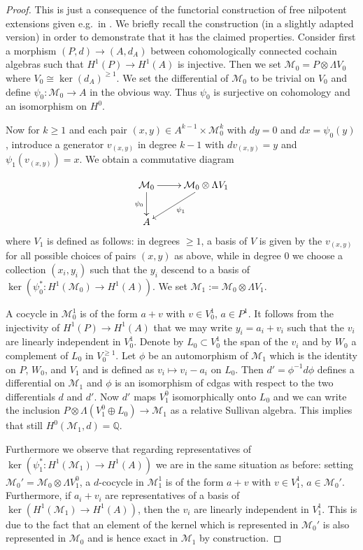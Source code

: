 \documentclass[12pt,a4paper]{article}
\theoremstyle{definition}
\begin{document}
\begin{proof}
This is just a consequence of the functorial construction of free nilpotent extensions given e.g.\ in \cite[Section 4.7]{BG}. We briefly recall the construction (in a slightly adapted version) in order to demonstrate that it has the claimed properties. Consider first a morphism $(P,d)\rightarrow (A,d_A)$ between cohomologically connected cochain algebras such that $H^1(P)\rightarrow H^1(A)$ is injective. Then we set $\mathcal{M}_0=P\otimes \Lambda V_0$ where $V_0\cong \ker (d_A)^{\geq 1}$. We set the differential of $\mathcal{M}_0$ to be trivial on $V_0$ and define $\psi_0\colon \mathcal{M}_0\rightarrow A$ in the obvious way. Thus $\psi_0$ is surjective on cohomology and an isomorphism on $H^0$.

Now for $k\geq 1$ and each pair $(x,y)\in A^{k-1}\times \mathcal{M}_0^k$ with $dy=0$ and $dx=\psi_0(y)$, introduce a generator $v_{(x,y)}$ in degree $k-1$ with $dv_{(x,y)}=y$ and $\psi_1(v_{(x,y)})=x$. We obtain a commutative diagram

\[\xymatrix{
\mathcal{M}_0\ar[r]\ar[d]_{\psi_0}& \mathcal{M}_0\otimes \Lambda V_1\ar[dl]^{\psi_1}\\ A &
}\]
where $V_1$ is defined as follows:
in degrees $\geq 1$, a basis of $V$ is given by the $v_{(x,y)}$ for all possible choices of pairs $(x,y)$ as above, while in degree $0$ we choose a collection $(x_i,y_i)$ such that the $y_i$ descend to a basis of $\ker(\psi_0^*\colon H^1(\mathcal{M}_0)\rightarrow H^1(A))$. We set $\mathcal{M}_1:=\mathcal{M}_0\otimes \Lambda V_1$.

A cocycle in $\mathcal{M}_0^1$ is of the form $a+v$ with $v\in V_0^1$, $a\in P^1$.
It follows from the injectivity of $H^1(P)\rightarrow H^1(A)$ that we may write $y_i=a_i+v_i$ such that the $v_i$ are linearly independent in $V_0^1$. Denote by $L_0\subset V_0^1$ the span of the $v_i$ and by $W_0$ a complement of $L_0$ in $V_0^{\geq 1}$. Let $\phi$ be an automorphism of $\mathcal{M}_1$ which is the identity on $P$, $W_0$, and $V_1$ and is defined as $v_i\mapsto v_i-a_i$ on $L_0$. Then $d'=\phi^{-1}d\phi$ defines a differential on $\mathcal{M}_1$ and $\phi$ is an isomorphism of cdgas with respect to the two differentials $d$ and $d'$. Now $d'$ maps $V_1^0$ isomorphically onto $L_0$ and we can write the inclusion $P\otimes \Lambda(V_1^0\oplus L_0)\rightarrow\mathcal{M}_1$ as a relative Sullivan algebra.
This implies that still $H^0(\mathcal{M}_1,d)=\mathbb{Q}$.

Furthermore we observe that regarding representatives of $\ker(\psi_1^*\colon H^1(\mathcal{M}_1)\rightarrow H^1(A))$ we are in the same situation as before: setting $\mathcal{M}_0'= \mathcal{M}_0\otimes \Lambda V_1^0$, a $d$-cocycle in $\mathcal{M}_1^1$ is of the form $a+v$ with $v\in V_1^1$, $a\in \mathcal{M}_0'$. Furthermore, if $a_i+v_i$ are representatives of a basis of $\ker (H^1(\mathcal{M}_1)\rightarrow H^1(A))$, then the $v_i$ are linearly independent in $V_1^1$. This is due to the fact that an element of the kernel which is represented in $\mathcal{M}_0'$ is also represented in $\mathcal{M}_0$ and is hence exact in $\mathcal{M}_1$ by construction.


\end{proof}
\end{document}
